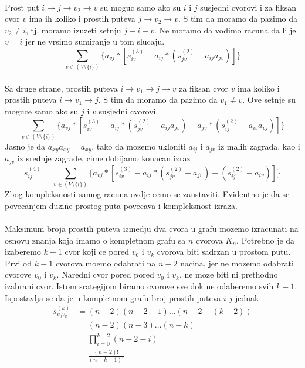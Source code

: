 \documentclass[11pt]{article}
\begin{document}
			\paragraph{}
			Prost put $i \rightarrow j \rightarrow v_2 \rightarrow v$ su moguc samo ako su $i$ i $j$ susjedni cvorovi i za fiksan cvor $v$ ima ih koliko i prostih puteva $j \rightarrow v_2 \rightarrow v$. 
			S tim da moramo da pazimo da $v_2 \neq i$, tj. moramo izuzeti setnju $j-i-v$. Ne moramo da vodimo racuna da li je $v=i$ jer ne vrsimo sumiranje u tom slucaju.
			\[
				\sum_{v \in (V \setminus \{i\})} \{a_{vj} * [s_{iv}^{(3)} - a_{ij} * (s_{jv}^{(2)} - a_{ij}a_{jv})]\}
			\]
		
			\paragraph{}
			Sa druge strane, prostih puteva $i \rightarrow v_1 \rightarrow j \rightarrow v$ za fiksan cvor $v$ ima koliko i prostih puteva $i \rightarrow v_1 \rightarrow j$. 
			S tim da moramo da pazimo da $v_1 \neq v$. Ove setnje su moguce samo ako su $j$ i $v$ susjedni cvorovi.
			\[
				\sum_{v \in (V \setminus \{i\})} \{a_{vj} * [s_{iv}^{(3)} - a_{ij} * (s_{jv}^{(2)} - a_{ij}a_{jv}) - a_{jv} * (s_{ij}^{(2)} -  a_{iv}a_{vj})]\}
			\]
			Jasno je da $a_{xy}a_{xy}=a_{xy}$, tako da mozemo ukloniti $a_{ij}$ i $a_{jv}$ iz malih zagrada, kao i $a_{jv}$ iz srednje zagrade, cime dobijamo konacan izraz
			 \[
				s_{ij}^{(4)} = \sum_{v \in (V \setminus \{i\})} \{a_{vj} * [s_{iv}^{(3)} - a_{ij} * (s_{jv}^{(2)} - a_{jv}) - (s_{ij}^{(2)} -  a_{iv})]\}
			 \]
			Zbog kompleksnosti samog racuna ovdje cemo se zaustaviti.
			Evidentno je da se povecanjem duzine prostog puta povecava i kompleksnost izraza.
		
			\paragraph{}
			Maksimum broja prostih puteva izmedju dva cvora u grafu mozemo izracunati na osnovu znanja koja imamo o kompletnom grafu sa $n$ cvorova $K_n$.
			Potrebno je da izaberemo $k-1$ cvor koji ce pored $v_0$ i $v_k$ cvorova biti sadrzan u prostom putu. Prvi od $k-1$ cvorova moemo odabrati na $n-2$ nacina, 
			jer ne mozemo odabrati cvorove $v_0$ i $v_k$. Naredni cvor pored pored $v_0$ i $v_k$, ne moze biti ni prethodno izabrani cvor. Istom srategijom biramo cvorove sve dok ne odaberemo svih $k-1$. 
			Ispostavlja se da je u kompletnom grafu broj prostih puteva $i$-$j$ jednak 
			\[
				\begin{split}
				s_{v_0 v_k}^{(k)} & = (n-2)(n-2-1) \dots (n-2-(k-2)) \\
				                  & = (n-2)(n-3) \dots (n-k) \\
				                  & = \prod_{i=0}^{k-2} (n-2-i) \\ 
				                  & = \frac{(n-2)!}{(n-k-1)!}
				\end{split}
			\]
\end{document}
